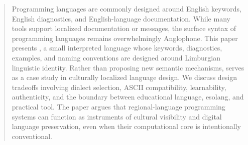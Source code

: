 \begin{abstract}
Programming languages are commonly designed around English keywords, English
diagnostics, and English-language documentation. While many tools support
localized documentation or messages, the surface syntax of programming
languages remains overwhelmingly Anglophone. This paper presents \plat, a small
interpreted language whose keywords, diagnostics, examples, and naming
conventions are designed around Limburgian linguistic identity. Rather than
proposing new semantic mechanisms, \plat{} serves as a case study in culturally
localized language design. We discuss design tradeoffs involving dialect
selection, ASCII compatibility, learnability, authenticity, and the boundary
between educational language, esolang, and practical tool. The paper argues
that regional-language programming systems can function as instruments of
cultural visibility and digital language preservation, even when their
computational core is intentionally conventional.
\end{abstract}
